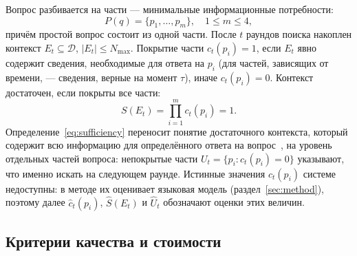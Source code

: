 \documentclass{misisarticle}
\begin{document}
Вопрос разбивается на части --- минимальные информационные потребности:
\begin{equation}
  P(q) = \{p_1, \dots, p_m\}, \quad 1 \le m \le 4,
  \label{eq:parts}
\end{equation}
причём простой вопрос состоит из одной части.
После $t$ раундов поиска накоплен контекст $E_t \subseteq \mathcal{D}$, $|E_t| \le N_{\max}$.
Покрытие части $c_t(p_i) = 1$, если $E_t$ явно содержит сведения, необходимые для ответа на $p_i$ (для частей, зависящих от времени, --- сведения, верные на момент $\tau$), иначе $c_t(p_i) = 0$.
Контекст достаточен, если покрыты все части:
\begin{equation}
  S(E_t) = \prod_{i=1}^{m} c_t(p_i) = 1.
  \label{eq:sufficiency}
\end{equation}
Определение~\eqref{eq:sufficiency} переносит понятие достаточного контекста, который содержит всю информацию для определённого ответа на вопрос~\cite{joren2024sufficient}, %
на уровень отдельных частей вопроса: непокрытые части $U_t = \{p_i : c_t(p_i) = 0\}$ указывают, что именно искать на следующем раунде.
Истинные значения $c_t(p_i)$ системе недоступны: в методе их оценивает языковая модель (раздел~\ref{sec:method}), поэтому далее $\hat{c}_t(p_i)$, $\hat{S}(E_t)$ и $\hat{U}_t$ обозначают оценки этих величин.

\subsection{Критерии качества и стоимости}
\end{document}
